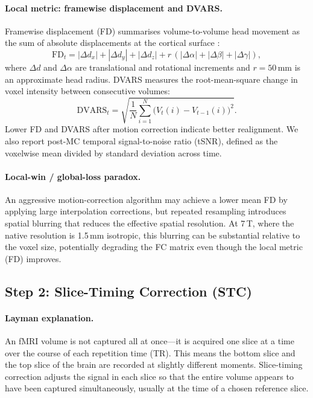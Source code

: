 \documentclass[11pt,a4paper]{article}
\begin{document}
\paragraph{Local metric: framewise displacement and DVARS.}
Framewise displacement (FD) summarises volume-to-volume head movement as the sum of absolute displacements at the cortical surface \citep{power2012}:
\begin{equation}
    \mathrm{FD}_t = |\Delta d_x| + |\Delta d_y| + |\Delta d_z| + r\,(|\Delta\alpha| + |\Delta\beta| + |\Delta\gamma|),
\end{equation}
where $\Delta d$ and $\Delta\alpha$ are translational and rotational increments and $r = 50$\,mm is an approximate head radius.  DVARS measures the root-mean-square change in voxel intensity between consecutive volumes:
\begin{equation}
    \mathrm{DVARS}_t = \sqrt{\frac{1}{N}\sum_{i=1}^{N}\bigl(V_t(i) - V_{t-1}(i)\bigr)^2}.
\end{equation}
Lower FD and DVARS after motion correction indicate better realignment.  We also report post-MC temporal signal-to-noise ratio (tSNR), defined as the voxelwise mean divided by standard deviation across time.

\paragraph{Local-win / global-loss paradox.}
An aggressive motion-correction algorithm may achieve a lower mean FD by applying large interpolation corrections, but repeated resampling introduces spatial blurring that reduces the effective spatial resolution.  At 7\,T, where the native resolution is 1.5\,mm isotropic, this blurring can be substantial relative to the voxel size, potentially degrading the FC matrix even though the local metric (FD) improves.

\subsection{Step 2: Slice-Timing Correction (STC)}
\label{app:stc}

\paragraph{Layman explanation.}
An fMRI volume is not captured all at once---it is acquired one slice at a time over the course of each repetition time (TR).  This means the bottom slice and the top slice of the brain are recorded at slightly different moments.  Slice-timing correction adjusts the signal in each slice so that the entire volume appears to have been captured simultaneously, usually at the time of a chosen reference slice.
\end{document}
